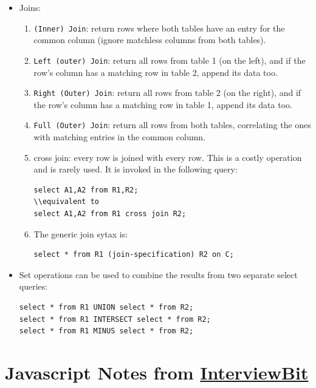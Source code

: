 \documentclass{report}
\begin{document}
\begin{itemize}
\item Joins:
\begin{enumerate}
\item \texttt{(Inner) Join}: return rows where both tables have an entry for the common column (ignore matchless columns from both tables).
\item \texttt{Left (outer) Join}: return all rows from table 1 (on the left), and if the row's column has a matching row in table 2, append its data too. 
\item \texttt{Right (Outer) Join}: return all rows from table 2 (on the right), and if the row's column has a matching row in table 1, append its data too.  
\item \texttt{Full (Outer) Join}: return all rows from both tables, correlating the ones with matching entries in the common column. 
\item cross join: every row is joined with every row. This is a costly operation and is rarely used. It is invoked in the following query:
\begin{lstlisting}
select A1,A2 from R1,R2;
\\equivalent to
select A1,A2 from R1 cross join R2;
\end{lstlisting}
\item The generic join sytax is:
\begin{lstlisting}
select * from R1 (join-specification) R2 on C;
\end{lstlisting}
\end{enumerate}
\item Set operations can be used to combine the results from two separate select queries:
\begin{lstlisting}[caption=Set Operation]
select * from R1 UNION select * from R2;
select * from R1 INTERSECT select * from R2;
select * from R1 MINUS select * from R2;
\end{lstlisting}
\end{itemize}
\chapter{Javascript Notes from \href{https://www.interviewbit.com/javascript-interview-questions/}{InterviewBit}}
\end{document}
